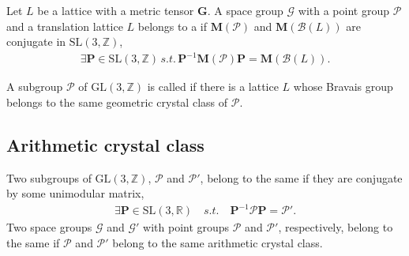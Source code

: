 \begin{screen}
  \begin{defn}
    Let $L$ be a lattice with a metric tensor $\bm{G}$.
    A space group $\mathcal{G}$ with a point group $\mathcal{P}$ and a translation lattice $L$ belongs to a  if $\bm{M}(\mathcal{P})$ and $\bm{M}(\mathcal{B}(L))$ are conjugate in $\mathrm{SL}(3, \mathbb{Z})$,
    \begin{align}
      \exists \bm{P} \in \mathrm{SL}(3, \mathbb{Z}) \,s.t.\, \bm{P}^{-1} \bm{M}(\mathcal{P}) \bm{P} = \bm{M}(\mathcal{B}(L)).
    \end{align}
  \end{defn}
\end{screen}


\begin{screen}
  \begin{defn}[holohedry]
    A subgroup $\mathcal{P}$ of $\mathrm{GL}(3, \mathbb{Z})$ is called  if there is a lattice $L$ whose Bravais group belongs to the same geometric crystal class of $\mathcal{P}$.
  \end{defn}
\end{screen}


\subsection{\label{sec:arithmetic-crystal-class}Arithmetic crystal class}

\begin{screen}
  \begin{defn}
    Two subgroups of $\mathrm{GL}(3, \mathbb{Z})$, $\mathcal{P}$ and $\mathcal{P}'$, belong to the same  if they are conjugate by some unimodular matrix,
    \begin{align}
      \exists \bm{P} \in \mathrm{SL}(3, \mathbb{R}) \quad s.t. \quad \bm{P}^{-1} \mathcal{P} \bm{P} = \mathcal{P}'.
    \end{align}
    Two space groups $\mathcal{G}$ and $\mathcal{G}'$ with point groups $\mathcal{P}$ and $\mathcal{P}'$, respectively, belong to the same  if $\mathcal{P}$ and $\mathcal{P}'$ belong to the same arithmetic crystal class.
  \end{defn}
\end{screen}

